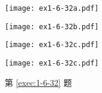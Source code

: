 \begin{Exercise}[复习题]
\begin{question}
\begin{figurehere}
\begin{minipage}{\linewidth}
\begin{minipage}{0.22\linewidth}
				\texttt{[image: ex1-6-32a.pdf]}
				\subcaption{}
			\end{minipage}
			\begin{minipage}{0.22\linewidth}\centering
				\texttt{[image: ex1-6-32b.pdf]}
				\subcaption{}
			\end{minipage}
			\begin{minipage}{0.22\linewidth}\centering
				\texttt{[image: ex1-6-32c.pdf]}
				\subcaption{}
			\end{minipage}
			\begin{minipage}{0.22\linewidth}\centering
				\texttt{[image: ex1-6-32c.pdf]}
				\subcaption{}
			\end{minipage}
      \caption*{第 \ref{exec:1-6-32} 题}
		\end{minipage}
	\end{figurehere}
\end{question}
\end{Exercise}
